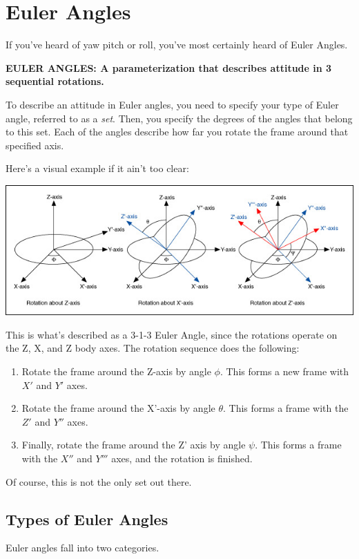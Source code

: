 \documentclass[a4paper,14pt]{extreport}
\begin{document}
\chapter{Euler Angles}

If you've heard of yaw pitch or roll, you've most certainly heard of Euler Angles.
\begin{center}
\textbf{EULER ANGLES: A parameterization that describes attitude in 3 sequential rotations.}
\end{center}

To describe an attitude in Euler angles, you need to specify your type of Euler angle, referred to as a \emph{set}. Then, you specify the degrees of the angles that belong to this set. Each of the angles describe how far you rotate the frame around that specified axis. 

Here's a visual example if it ain't too clear:

\begin{center}
\includegraphics[width=16cm]{euler_proper}
\end{center}

This is what's described as a 3-1-3 Euler Angle, since the rotations operate on the Z, X, and Z body axes. The rotation sequence does the following:
\begin{enumerate}
\item Rotate the frame around the Z-axis by angle $\phi$. This forms a new frame with $X'$ and $Y'$ axes.
\item Rotate the frame around the X'-axis by angle $\theta$. This forms a frame with the $Z'$ and $Y''$ axes.
\item Finally, rotate the frame around the Z' axis by angle $\psi$. This forms a frame with the $X''$ and $Y'''$ axes, and the rotation is finished.
\end{enumerate}

Of course, this is not the only set out there.

\section{Types of Euler Angles}
Euler angles fall into two categories.
\end{document}
